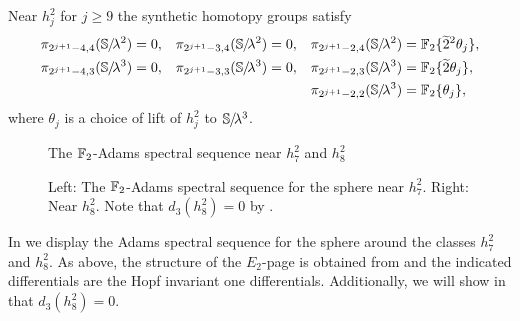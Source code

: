 \begin{lem} \label{lem:near-hj2}
  Near $h_{j}^2$ for $j \geq 9$ the synthetic homotopy groups satisfy
  \begin{align*}    
    \pi_{2^{j+1}-4,4}(\clambda^2) &= 0,
    & \pi_{2^{j+1}-3,4}(\clambda^2) &= 0,
    & \pi_{2^{j+1}-2,4}(\clambda^2) &= \F_2\{ \wt{2}^2 \theta_j \}, \\
    \pi_{2^{j+1}-4,3}(\clambda^3) &= 0,
    &  \pi_{2^{j+1}-3,3}(\clambda^3) &= 0,
    & \pi_{2^{j+1}-2,3}(\clambda^3) &= \F_2\{ \wt{2} \theta_j \}, \\
    &
    & &
    & \pi_{2^{j+1}-2,2}(\clambda^3) &= \F_2\{ \theta_j \},
  \end{align*}
  where $\theta_j$ is a choice of lift of $h_j^2$ to $\operatorname{\mathbb{S}}\hspace{-2.2pt}/\!\lambda^3$.
\end{lem}


\begin{figure}[t]
  \centering
  The $\operatorname{\mathbb{F}}_2$-Adams spectral sequence near $h_7^2$ and $h_8^2$ \\\vspace{6pt}
  \scalebox{1.00}{
    \printpage[ name = theta7ASS, page = 2 ]
    \printpage[ name = theta8ASS, page = 2, no y ticks, x axis tail = 0cm ]
  }
  \caption{
    Left: The $\operatorname{\mathbb{F}}_2$-Adams spectral sequence for the sphere near $h_7^2$.
    Right: Near $h_8^2$. Note that $d_3(h_8^2) = 0$ by .
  }
  \label{fig:theta7-8}    
\end{figure}

In  we display the Adams spectral sequence for the sphere around the classes $h_7^2$ and $h_8^2$. As above, the structure of the $E_2$-page is obtained from \cite{Ext5} and the indicated differentials are the Hopf invariant one differentials. Additionally, we will show in  that $d_3(h_8^2) = 0$.

